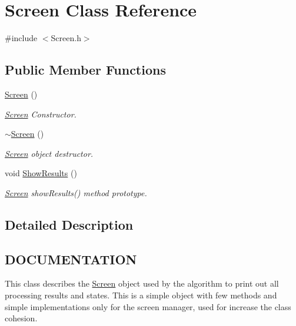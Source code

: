 \hypertarget{classScreen}{}\section{Screen Class Reference}
\label{classScreen}


{\ttfamily \#include $<$Screen.\+h$>$}

\subsection*{Public Member Functions}
\begin{DoxyCompactItemize}
\item 
\hyperlink{classScreen_ae7576476fc6e6a6eaa66389fdc41fe72}{Screen} ()
\begin{DoxyCompactList}\small\item\em \hyperlink{classScreen}{Screen} Constructor. \end{DoxyCompactList}\item 
\mbox{\label{classScreen_a4243bc17596af96415b09ac48205676d}} 
\hyperlink{classScreen_a4243bc17596af96415b09ac48205676d}{$\sim$\+Screen} ()
\begin{DoxyCompactList}\small\item\em \hyperlink{classScreen}{Screen} object destructor. \end{DoxyCompactList}\item 
void \hyperlink{classScreen_a730e65a899182a4de7ac55b2794fa2ae}{Show\+Results} ()
\begin{DoxyCompactList}\small\item\em \hyperlink{classScreen}{Screen} show\+Results() method prototype. \end{DoxyCompactList}\end{DoxyCompactItemize}


\subsection{Detailed Description}
\hypertarget{classScreen_CLASS}{}\subsection{D\+O\+C\+U\+M\+E\+N\+T\+A\+T\+I\+ON}\label{classScreen_CLASS}
This class describes the \hyperlink{classScreen}{Screen} object used by the algorithm to print out all processing results and states. This is a simple object with few methods and simple implementations only for the screen manager, used for increase the class cohesion. 

